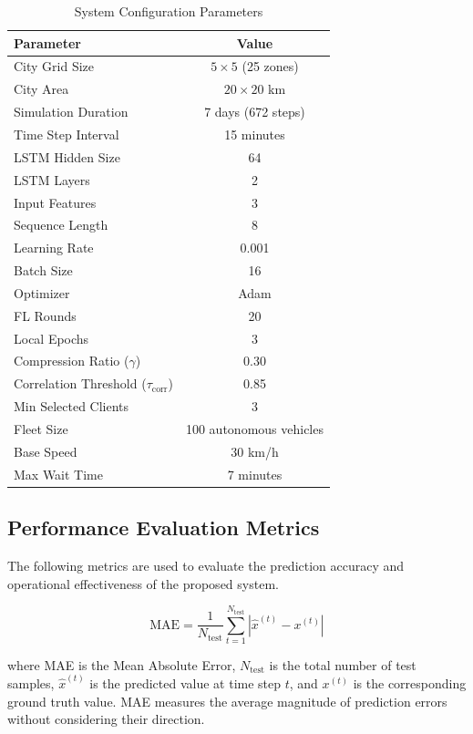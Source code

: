 \documentclass[journal]{IEEEtran}
\begin{document}
\begin{table}[!htbp]
\centering
\caption{System Configuration Parameters}
\label{tab:config}
\begin{tabular}{l c}
\toprule
\textbf{Parameter} & \textbf{Value} \\
\midrule
City Grid Size & $5 \times 5$ (25 zones) \\
City Area & $20 \times 20$ km \\
Simulation Duration & 7 days (672 steps) \\
Time Step Interval & 15 minutes \\
\midrule
LSTM Hidden Size & 64 \\
LSTM Layers & 2 \\
Input Features & 3 \\
Sequence Length & 8 \\
Learning Rate & 0.001 \\
Batch Size & 16 \\
Optimizer & Adam \\
\midrule
FL Rounds & 20 \\
Local Epochs & 3 \\
Compression Ratio ($\gamma$) & 0.30 \\
Correlation Threshold ($\tau_{\text{corr}}$) & 0.85 \\
Min Selected Clients & 3 \\
\midrule
Fleet Size & 100 autonomous vehicles \\
Base Speed & 30 km/h \\
Max Wait Time & 7 minutes \\
\bottomrule
\end{tabular}
\end{table}

\subsection{Performance Evaluation Metrics}

The following metrics are used to evaluate the prediction accuracy and operational effectiveness of the proposed system.

\begin{equation}
\text{MAE} = \frac{1}{N_{\text{test}}} \sum_{t=1}^{N_{\text{test}}} \left|\hat{x}^{(t)} - x^{(t)}\right|
\label{eq:mae}
\end{equation}

\noindent where MAE is the Mean Absolute Error, $N_{\text{test}}$ is the total number of test samples, $\hat{x}^{(t)}$ is the predicted value at time step $t$, and $x^{(t)}$ is the corresponding ground truth value. MAE measures the average magnitude of prediction errors without considering their direction.
\end{document}
